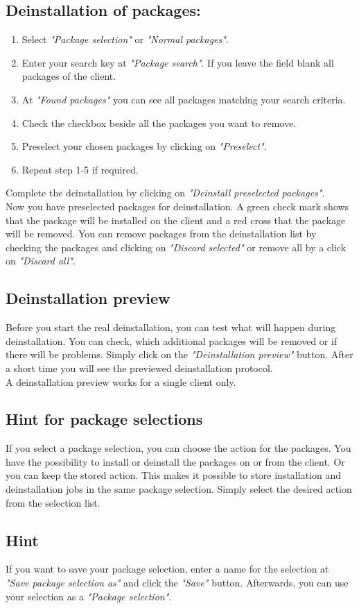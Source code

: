 \subsection{Deinstallation of packages:}
\begin{enumerate}
\item  Select \textit{"Package selection"} or \textit{"Normal packages"}.\\
\item  Enter your search key at \textit{"Package search"}. If you leave the field blank all packages of the client.\\
\item  At \textit{"Found packages"} you can see all packages matching your search criteria.\\
\item  Check the checkbox beside all the packages you want to remove.\\
\item  Preselect your chosen packages by clicking on \textit{"Preselect"}.\\
\item  Repeat step 1-5 if required.\\
\end{enumerate}
Complete the deinstallation by clicking on \textit{"Deinstall preselected packages"}.\\
Now you have preselected packages for deinstallation. A green check mark shows that the package will be installed on the client and a red cross that the package will be removed. You can remove packages from the deinstallation list by checking the packages and clicking on \textit{"Discard selected"} or remove all by a click on \textit{"Discard all"}.\\
\subsection{Deinstallation preview}
Before you start the real deinstallation, you can test what will happen during deinstallation. You can check, which additional packages will be removed or if there will be problems. Simply click on the \textit{"Deinstallation preview"} button. After a short time you will see the previewed deinstallation protocol.\\
A deinstallation preview works for a single client only.\\
\subsection{Hint for package selections}
If you select a package selection, you can choose the action for the packages. You have the possibility to install or deinstall the packages on or from the client. Or you can keep the stored action. This makes it possible to store installation and deinstallation jobs in the same package selection. Simply select the desired action from the selection list.\\
\subsection{Hint}
If you want to save your package selection, enter a name for the selection at \textit{"Save package selection as"} and click the \textit{"Save"} button. Afterwards, you can use your selection as a \textit{"Package selection"}.\\
